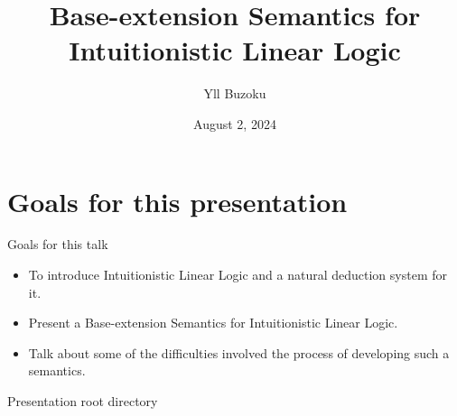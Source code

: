 \documentclass{beamer}
\title[B-eS for ILL]{Base-extension Semantics for Intuitionistic Linear Logic}
\author{Yll Buzoku}
\institute[UCL]{%
  Department of Computer Science \\ %
  University College London
}
\date{August 2, 2024}
\begin{document}
\begin{frame}
\titlepage
\end{frame}
\section*{Goals for this presentation}
\begin{frame}{Goals for this talk}
\begin{itemize}%
\item To introduce Intuitionistic Linear Logic and a natural deduction system for it.
\item Present a Base-extension Semantics for Intuitionistic Linear Logic.
\item Talk about some of the difficulties involved the process of developing such a semantics.
\end{itemize}
\end{frame}
\begin{frame}{Presentation root directory}
\tableofcontents
\end{frame}
\end{document}
